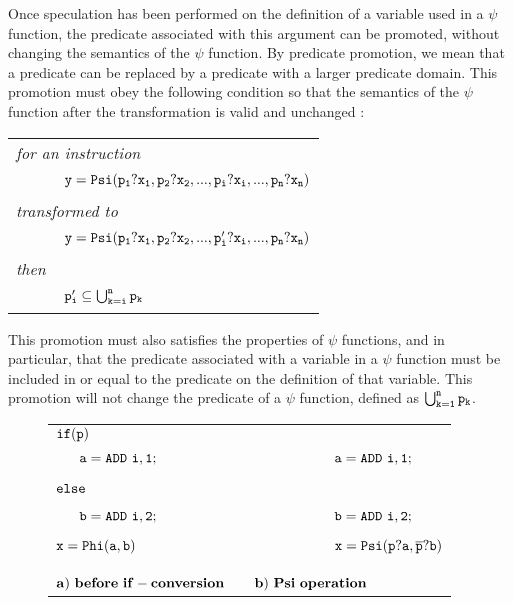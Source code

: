 \begin{itemize}
Once speculation has been performed on the definition of a variable
used in a $\psi$ function, the predicate associated with this
argument can be promoted, without changing the semantics of the $\psi$
function. By predicate promotion, we mean that a predicate can be
replaced by a predicate with a larger predicate domain. This promotion
must obey the following condition so that the semantics of the $\psi$
function after the transformation is valid and unchanged :

\begin{tabular}{ll}
\multicolumn{2}{l}{\it for an instruction} \\
\ \ \ \ & {$ {\tt y = Psi(p_1?x_1, p_2?x_2, ..., p_i?x_i, ..., p_n?x_n)}$} \\
\multicolumn{2}{l}{\it transformed to} \\
\ \ \ \ & {$ {\tt y = Psi(p_1?x_1, p_2?x_2, ..., p_i'?x_i, ..., p_n?x_n)}$} \\
\multicolumn{2}{l}{\it then} \\
\ \ \ \ & {${\tt p_i' \subseteq \bigcup_{k=i}^n p_k}$} \\
\end{tabular}

This promotion must also satisfies the properties of $\psi$
functions, and in particular, that the predicate associated with a
variable in a $\psi$ function must be included in or equal to the
predicate on the definition of that variable. This promotion will not
change the predicate of a $\psi$ function, defined as ${\tt
  \bigcup_{k=1}^n p_k}$.

\begin{figure*}
\begin{center}
\footnotesize
\begin{tabular}{llll}
${\tt if (p)}$                & & & \\
${\tt\ \ \ \ \ a = ADD\ i,1;}$ & \ \ \ \ \ \ \ \  & \ \ \ \ \ \ \ \  & ${\tt a = ADD\ i,1;}$ \\
${\tt else}$                  & \ \ \ \ \ \ \ \  & \ \ \ \ \ \ \ \  & \\
${\tt\ \ \ \ \ b = ADD\ i,2;}$ & \ \ \ \ \ \ \ \  & \ \ \ \ \ \ \ \  & ${\tt b = ADD\ i,2;}$ \\
${\tt x = Phi(a, b)}$         & \ \ \ \ \ \ \ \  & \ \ \ \ \ \ \ \  & ${\tt x = Psi(p?a, \overline{p}?b)}$ \\
\\
\\
\multicolumn{2}{l}{${\tt{\bf a)\ before\ if-conversion}}$} & \multicolumn{2}{l}{${\tt{\bf b)\ Psi\ operation}}$} \\
\end{tabular}
\label{fig:psi_partial}
\end{center}
\end{figure*}


\end{itemize}
